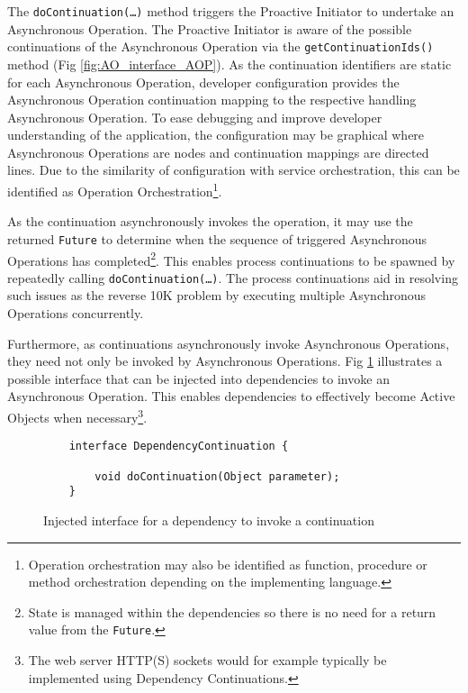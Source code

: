 \documentclass[prodmode]{style/acmlarge}
\begin{document}
The \texttt{doContinuation(\ldots)} method triggers the Proactive Initiator to
undertake an Asynchronous Operation.  The Proactive Initiator is aware of the
possible continuations of the Asynchronous Operation via the
\texttt{getContinuationIds()} method (Fig \ref{fig:AO_interface_AOP}).  As the
continuation identifiers are static for each Asynchronous Operation, developer
configuration provides the Asynchronous Operation continuation mapping to the
respective handling Asynchronous Operation.  To ease debugging and improve
developer understanding of the application, the configuration may be graphical
where Asynchronous Operations are nodes and continuation mappings are directed
lines.  Due to the similarity of configuration with service orchestration, this
can be identified as Operation Orchestration\footnote{Operation orchestration
may also be identified as function, procedure or method orchestration depending
on the implementing language.}.

As the continuation asynchronously invokes the operation, it may use the
returned \texttt{Future} to determine when the sequence of triggered
Asynchronous Operations has completed\footnote{State is managed within the
dependencies so there is no need for a return value from the \texttt{Future}.}.
This enables process continuations \cite{process-continuation} to be spawned by
repeatedly calling \texttt{doContinuation(\ldots)}.  The process continuations
aid in resolving such issues as the reverse 10K problem
\cite{reverse-ten-k-problem} by executing multiple Asynchronous Operations
concurrently.

Furthermore, as continuations asynchronously invoke Asynchronous Operations,
they need not only be invoked by Asynchronous Operations. Fig
\ref{fig:DC_interface} illustrates a possible interface that can be injected
into dependencies to invoke an Asynchronous Operation.  This enables
dependencies to effectively become Active Objects \cite{active-object} when
necessary\footnote{The web server HTTP(S) sockets would for example typically be
implemented using Dependency Continuations.}.

\begin{figure}[tp]
\begin{verbatim}
    interface DependencyContinuation {

        void doContinuation(Object parameter);
    }
\end{verbatim}
\caption{Injected interface for a dependency to invoke a continuation}
\label{fig:DC_interface}
\end{figure}
\end{document}
